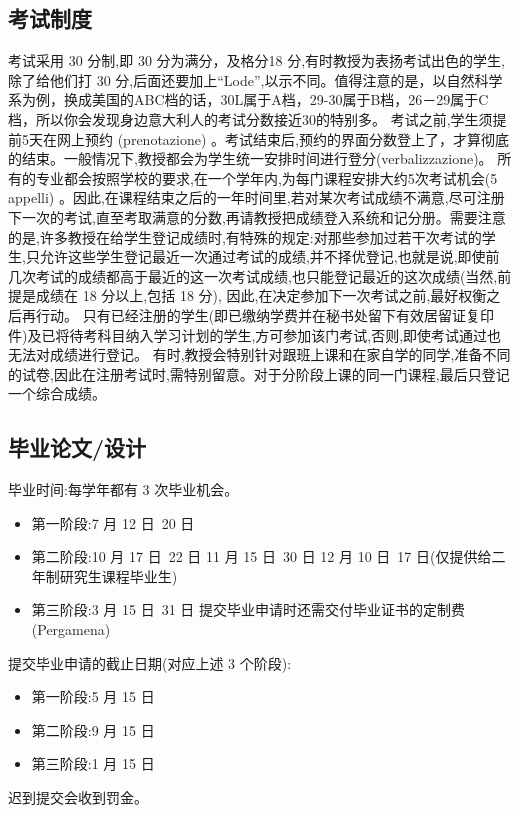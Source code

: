 \subsection{考试制度}
考试采用 30 分制,即 30 分为满分，及格分18 分,有时教授为表扬考试出色的学生,除了给他们打 30 分,后面还要加上“Lode”,以示不同。值得注意的是，以自然科学系为例，换成美国的ABC档的话，30L属于A档，29-30属于B档，26－29属于C档，所以你会发现身边意大利人的考试分数接近30的特别多。
考试之前,学生须提前5天在网上预约 (prenotazione) 。考试结束后,预约的界面分数登上了，才算彻底的结束。一般情况下,教授都会为学生统一安排时间进行登分(verbalizzazione)。
所有的专业都会按照学校的要求,在一个学年内,为每门课程安排大约5次考试机会(5 appelli) 。因此,在课程结束之后的一年时间里,若对某次考试成绩不满意,尽可注册下一次的考试,直至考取满意的分数,再请教授把成绩登入系统和记分册。需要注意的是,许多教授在给学生登记成绩时,有特殊的规定:对那些参加过若干次考试的学生,只允许这些学生登记最近一次通过考试的成绩,并不择优登记,也就是说,即使前几次考试的成绩都高于最近的这一次考试成绩,也只能登记最近的这次成绩(当然,前提是成绩在 18 分以上,包括 18 分), 因此,在决定参加下一次考试之前,最好权衡之后再行动。 只有已经注册的学生(即已缴纳学费并在秘书处留下有效居留证复印件)及已将待考科目纳入学习计划的学生,方可参加该门考试,否则,即使考试通过也无法对成绩进行登记。 
有时,教授会特别针对跟班上课和在家自学的同学,准备不同的试卷,因此在注册考试时,需特别留意。对于分阶段上课的同一门课程,最后只登记一个综合成绩。

\subsection{毕业论文/设计}

毕业时间:每学年都有 3 次毕业机会。 
\begin{itemize}
\item 第一阶段:7 月 12 日~20 日
\item 第二阶段:10 月 17 日~22 日 11 月 15 日~30 日 12 月 10 日~17 日(仅提供给二年制研究生课程毕业生) 
\item 第三阶段:3 月 15 日~31 日
提交毕业申请时还需交付毕业证书的定制费 (Pergamena) 
\end{itemize}

提交毕业申请的截止日期(对应上述 3 个阶段): 
\begin{itemize}
\item 第一阶段:5 月 15 日
\item 第二阶段:9 月 15 日
\item 第三阶段:1 月 15 日 
\end{itemize}
迟到提交会收到罚金。

